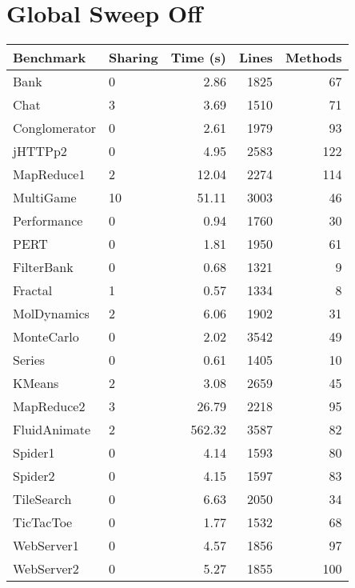 \documentclass{article}
\begin{document}
\section{Global Sweep Off}
\begin{tabular}{|l|l|r|r|r|}
\hline
Benchmark & Sharing & Time (s) & Lines & Methods \\
\hline
Bank & 0 & 2.86 & 1825 & 67 \\
Chat & 3 & 3.69 & 1510 & 71 \\
Conglomerator & 0 & 2.61 & 1979 & 93 \\
jHTTPp2 & 0 & 4.95 & 2583 & 122 \\
MapReduce1 & 2 & 12.04 & 2274 & 114 \\
MultiGame & 10 & 51.11 & 3003 & 46 \\
Performance & 0 & 0.94 & 1760 & 30 \\
PERT & 0 & 1.81 & 1950 & 61 \\
FilterBank & 0 & 0.68 & 1321 & 9 \\
Fractal & 1 & 0.57 & 1334 & 8 \\
MolDynamics & 2 & 6.06 & 1902 & 31 \\
MonteCarlo & 0 & 2.02 & 3542 & 49 \\
Series & 0 & 0.61 & 1405 & 10 \\
KMeans & 2 & 3.08 & 2659 & 45 \\
MapReduce2 & 3 & 26.79 & 2218 & 95 \\
FluidAnimate & 2 & 562.32 & 3587 & 82 \\
Spider1 & 0 & 4.14 & 1593 & 80 \\
Spider2 & 0 & 4.15 & 1597 & 83 \\
TileSearch & 0 & 6.63 & 2050 & 34 \\
TicTacToe & 0 & 1.77 & 1532 & 68 \\
WebServer1 & 0 & 4.57 & 1856 & 97 \\
WebServer2 & 0 & 5.27 & 1855 & 100 \\
\hline
\end{tabular}
\end{document}
